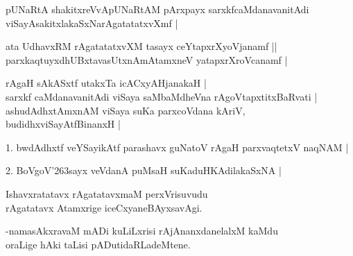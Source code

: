 \begin{entry}
\end{entry}

\begin{entry}
\begin{shl}
pUNaRtA shakitxreVvApUNaRtAM pArxpayx sarxkfcaMdanavanitAdi viSayAsakitxlakaSxNarAgatatatxvXmf |
\end{shl}
\begin{shl}
ata UdhavxRM rAgatatatxvXM tasayx ceYtapxrXyoVjanamf ||\\
parxkaqtuyxdhUBxtavasUtxnAmAtamxneV yatapxrXroVcanamf |
\end{shl}
\end{entry}

\begin{entry}
\gl{}
\info{}{}{}{}
\begin{shl}
rAgaH sAkASxtf utakxTa icACxyAHjanakaH |\\
sarxkf caMdanavanitAdi viSaya saMbaMdheVna rAgoVtapxtitxBaRvati |\\
ashudAdhxtAmxnAM viSaya suKa parxcoVdana kAriV, budidhxviSayAtfBinanxH |
\end{shl}
\begin{shl}
1. bwdAdhxtf veYSayikAtf parashavx guNatoV rAgaH parxvaqtetxV naqNAM |
\end{shl}
\begin{shl}
2. BoVgoV\char'263sayx veVdanA puMsaH suKaduHKAdilakaSxNA |
\end{shl}
\end{entry}

\begin{entry}
\gl{}
\begin{shl}
Ishavxratatavx rAgatatavxmaM perxVrisuvudu\\
rAgatatavx Atamxrige iceCxyaneBAyxsavAgi.
\end{shl}
\end{entry}

\begin{entry}
\begin{shl}
-namasAkxravaM mADi kuLiLxrisi rAjAnanxdanelalxM kaMdu\\
oraLige hAki taLisi pADutidaRLadeMtene.
\end{shl}
\end{entry}

